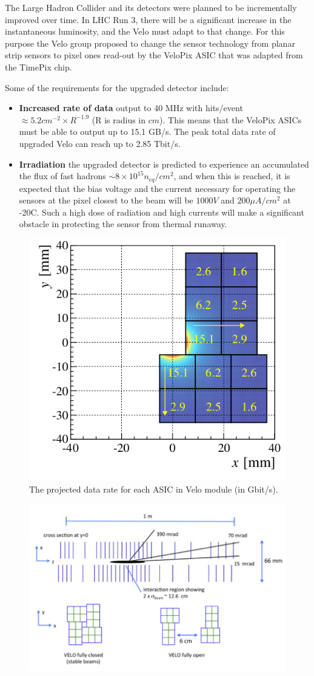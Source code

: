 The Large Hadron Collider and its detectors were planned to be incrementally
improved over time. In LHC Run 3, there will be a significant increase
in the instantaneous luminosity, and the Velo must adapt to that change. For this purpose the Velo group proposed to change the sensor technology from planar strip sensors to pixel ones
read-out by the VeloPix ASIC that was adapted from the TimePix chip.

Some of the requirements for the upgraded detector include:
\begin{itemize}
\item \textbf{Increased rate of data} output to 40 MHz with hits/event $≈ 5.2cm^{-2} \times R^{−1.9}$ (R is radius in $cm$).
This means that the VeloPix ASICs must be able to output up to 15.1 GB/s. The peak total data rate of upgraded Velo can reach up to 2.85 Tbit/s.
\item \textbf{Irradiation} the upgraded detector is predicted to experience an accumulated the flux of fast hadrons
$∼ 8 \times 10^{15}n_{eq} /cm^{2}$, and when this is reached, it is expected that the bias voltage and the current necessary for operating the sensors at the pixel closest to the beam will be $1000V$ and $200 \mu A/cm^{2}$ at -20C.
Such a high dose of radiation and high currents will make a significant obstacle in protecting the sensor from thermal runaway.
\end{itemize}


\begin{figure}
  \centering
  \includegraphics[width=0.4\linewidth]{figures/chapter2/data_rate.png}
  \caption{The projected data rate for each ASIC in Velo module (in Gbit/s).}
  \label{fig:velopix_datarate}
\end{figure}
\begin{figure}
  \centering
  \includegraphics[width=0.7\linewidth]{figures/chapter2/velopix_layout.png}
  \caption{  }
  \label{fig:velopix_layout}
\end{figure}

